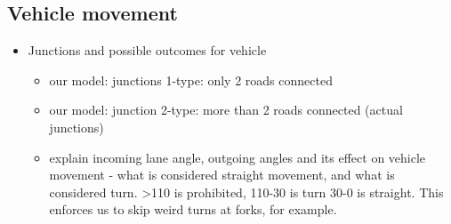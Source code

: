 \subsection{Vehicle movement}
\begin{itemize}
    \item Junctions and possible outcomes for vehicle
    \begin {itemize}
        \item our model: junctions 1-type: only 2 roads connected
        \item our model: junction 2-type: more than 2 roads connected (actual junctions)
        \item explain incoming lane angle, outgoing angles and its effect on vehicle movement - what is considered straight movement, and what is considered turn. >110 is prohibited, 110-30 is turn 30-0 is straight. This enforces us to skip weird turns at forks, for example.
    \end {itemize}


\end{itemize}
